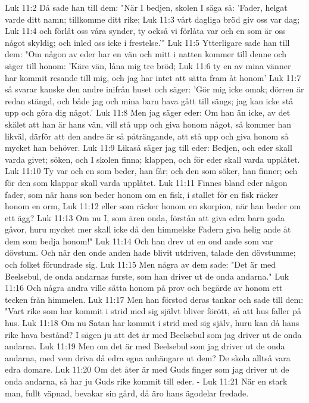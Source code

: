 Luk 11:2  Då sade han till dem: "När I bedjen, skolen I säga så: 'Fader, helgat varde ditt namn; tillkomme ditt rike;
Luk 11:3  vårt dagliga bröd giv oss var dag;
Luk 11:4  och förlåt oss våra synder, ty också vi förlåta var och en som är oss något skyldig; och inled oss icke i frestelse.'"
Luk 11:5  Ytterligare sade han till dem: "Om någon av eder har en vän och mitt i natten kommer till denne och säger till honom: 'Käre vän, låna mig tre bröd;
Luk 11:6  ty en av mina vänner har kommit resande till mig, och jag har intet att sätta fram åt honom'
Luk 11:7  så svarar kanske den andre inifrån huset och säger: 'Gör mig icke omak; dörren är redan stängd, och både jag och mina barn hava gått till sängs; jag kan icke stå upp och göra dig något.'
Luk 11:8  Men jag säger eder: Om han än icke, av det skälet att han är hans vän, vill stå upp och giva honom något, så kommer han likväl, därför att den andre är så påträngande, att stå upp och giva honom så mycket han behöver.
Luk 11:9  Likaså säger jag till eder: Bedjen, och eder skall varda givet; söken, och I skolen finna; klappen, och för eder skall varda upplåtet.
Luk 11:10  Ty var och en som beder, han får; och den som söker, han finner; och för den som klappar skall varda upplåtet.
Luk 11:11  Finnes bland eder någon fader, som när hans son beder honom om en fisk, i stallet för en fisk räcker honom en orm,
Luk 11:12  eller som räcker honom en skorpion, när han beder om ett ägg?
Luk 11:13  Om nu I, som ären onda, förstån att giva edra barn goda gåvor, huru mycket mer skall icke då den himmelske Fadern giva helig ande åt dem som bedja honom!"
Luk 11:14  Och han drev ut en ond ande som var dövstum. Och när den onde anden hade blivit utdriven, talade den dövstumme; och folket förundrade sig.
Luk 11:15  Men några av dem sade: "Det är med Beelsebul, de onda andarnas furste, som han driver ut de onda andarna."
Luk 11:16  Och några andra ville sätta honom på prov och begärde av honom ett tecken från himmelen.
Luk 11:17  Men han förstod deras tankar och sade till dem: "Vart rike som har kommit i strid med sig självt bliver förött, så att hus faller på hus.
Luk 11:18  Om nu Satan har kommit i strid med sig själv, huru kan då hans rike hava bestånd? I sägen ju att det är med Beelsebul som jag driver ut de onda andarna.
Luk 11:19  Men om det är med Beelsebul som jag driver ut de onda andarna, med vem driva då edra egna anhängare ut dem? De skola alltså vara edra domare.
Luk 11:20  Om det åter är med Guds finger som jag driver ut de onda andarna, så har ju Guds rike kommit till eder. -
Luk 11:21  När en stark man, fullt väpnad, bevakar sin gård, då äro hans ägodelar fredade.
